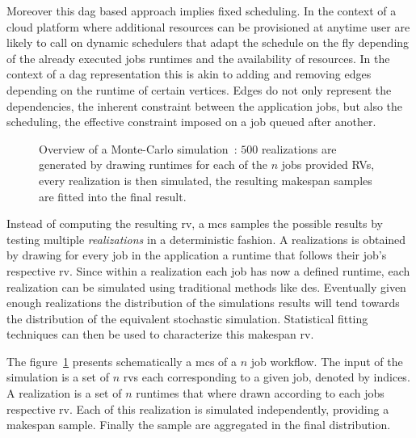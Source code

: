 \documentclass[10pt,conference,compsocconf]{IEEEtran}
\begin{document}
Moreover this \ac{dag} based approach implies fixed scheduling. In the context
of a cloud platform where additional resources can be provisioned at anytime
user are likely to call on dynamic schedulers that adapt the schedule on the fly
depending of the already executed jobs runtimes and the availability of
resources. In the context of a \ac{dag} representation this is akin to adding
and removing edges depending on the runtime of certain vertices. Edges do not
only represent the dependencies, the inherent constraint between the application
jobs, but also the scheduling, the effective constraint imposed on a job queued
after another.

\begin{figure}
	\centering
	\resizebox{0.5\textwidth}{!}{%
		
		}
\caption{Overview of a Monte-Carlo simulation~: $500$ realizations are generated
by drawing runtimes for each of the $n$ jobs provided RVs, every realization is
then simulated, the resulting makespan samples are fitted into the final
result.}\label{fig:mc-process}
\end{figure}

Instead of computing the resulting \ac{rv}, a \ac{mcs} samples the possible
results by testing multiple \emph{realizations} in a deterministic fashion.
A realizations is obtained by drawing for every job in the application a
runtime that follows their job's respective \ac{rv}. Since within a realization
each job has now a defined runtime, each realization can be simulated using
traditional methods like \ac{des}.  Eventually given enough realizations the
distribution of the simulations results will tend towards the distribution of
the equivalent stochastic simulation.  Statistical fitting techniques can then
be used to characterize this makespan \ac{rv}.

The figure~\ref{fig:mc-process} presents  schematically a \ac{mcs} of  a $n$ job
workflow.  The  input  of  the  simulation   is  a  set  of  $n$  \acp{rv}  each
corresponding to a given job, denoted by  indices. A realization is a set of $n$
runtimes that  where drawn according  to each  jobs respective \ac{rv}.  Each of
this   realization   is   simulated    independently,   providing   a   makespan
sample. Finally the sample are aggregated in the final distribution.
\end{document}
